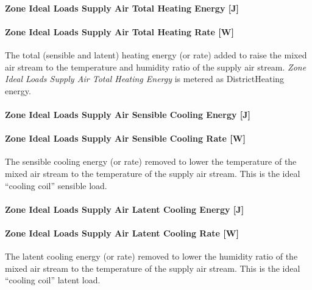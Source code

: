 \paragraph{Zone Ideal Loads Supply Air Total Heating Energy {[}J{]}}\label{zone-ideal-loads-supply-air-total-heating-energy-j}

\paragraph{Zone Ideal Loads Supply Air Total Heating Rate {[}W{]}}\label{zone-ideal-loads-supply-air-total-heating-rate-w}

The total (sensible and latent) heating energy (or rate) added to raise the mixed air stream to the temperature and humidity ratio of the supply air stream. \emph{Zone Ideal Loads Supply Air Total Heating Energy} is metered as DistrictHeating energy.

\paragraph{Zone Ideal Loads Supply Air Sensible Cooling Energy {[}J{]}}\label{zone-ideal-loads-supply-air-sensible-cooling-energy-j}

\paragraph{Zone Ideal Loads Supply Air Sensible Cooling Rate {[}W{]}}\label{zone-ideal-loads-supply-air-sensible-cooling-rate-w}

The sensible cooling energy (or rate) removed to lower the temperature of the mixed air stream to the temperature of the supply air stream. This is the ideal ``cooling coil'' sensible load.

\paragraph{Zone Ideal Loads Supply Air Latent Cooling Energy {[}J{]}}\label{zone-ideal-loads-supply-air-latent-cooling-energy-j}

\paragraph{Zone Ideal Loads Supply Air Latent Cooling Rate {[}W{]}}\label{zone-ideal-loads-supply-air-latent-cooling-rate-w}

The latent cooling energy (or rate) removed to lower the humidity ratio of the mixed air stream to the temperature of the supply air stream. This is the ideal ``cooling coil'' latent load.

